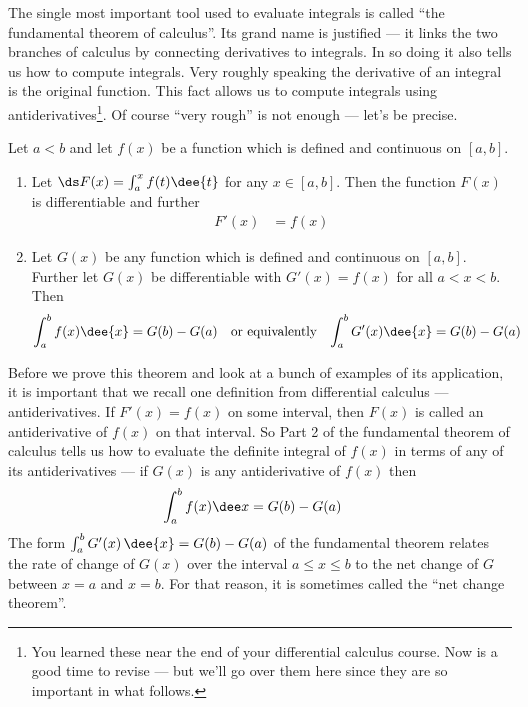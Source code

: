 The single most important tool used to evaluate integrals is called
``the fundamental theorem of calculus''. Its grand name is justified --- it
links the two branches of calculus by connecting derivatives to integrals. In
so
doing it also tells us how to compute integrals. Very roughly speaking the
derivative of an integral is the original function. This fact allows us to
compute integrals using antiderivatives\footnote{You learned these near the
end of your differential calculus course. Now is a good time to revise ---
but we'll go over them here since they are so important in what follows.}. Of
course ``very rough'' is not enough --- let's be precise.
\begin{theorem}\label{thm:INTfundthmofcalc}
Let $a<b$ and let $f(x)$ be a function which is defined and continuous on
$[a,b]$.
\begin{enumerate}
 \item Let $\ds F(x)=\int_a^x f(t)\dee{t}$ for any $x
\in[a,b]$. Then the function $F(x)$ is differentiable and further
\begin{align*}
 F'(x) &=f(x)
\end{align*}

\item Let $G(x)$ be any function which is defined and
continuous on $[a,b]$. Further let $G(x)$ be differentiable with $G'(x)=f(x)$
for all $a<x<b$. Then
\begin{align*}
\int_a^b f(x)\dee{x} &=G(b)-G(a) & \text{or equivalently} &&
\int_a^b G'(x)\dee{x} &=G(b)-G(a)
\end{align*}
\end{enumerate}
\end{theorem}

Before we prove this theorem and look at a bunch of examples of its
application, it is important that we recall one definition from differential
calculus --- antiderivatives. If $F'(x) = f(x)$ on some interval, then  $F(x)$
is called an antiderivative of $f(x)$ on that interval. So Part 2 of the
fundamental theorem of calculus tells us how to evaluate the definite integral
of $f(x)$ in terms of any of its antiderivatives ---  if  $G(x)$ is any
antiderivative of $f(x)$ then
\begin{align*}
\int_a^b f(x) \dee x &= G(b)-G(a)
\end{align*}
The form $\int_a^b G'(x)\,\dee{x} = G(b) - G(a)$ of the fundamental theorem relates the
rate of change of $G(x)$ over the interval $a\le x\le b$ to the net change of $G$ between
$x=a$ and $x=b$. For that reason, it is sometimes called the ``net change theorem''.

